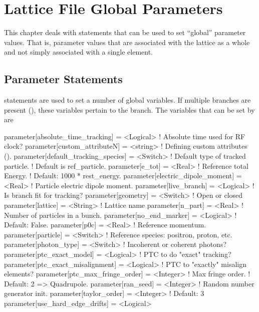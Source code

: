 \chapter{Lattice File Global Parameters}

This chapter deals with statements that can be used to set ``global''
parameter values. That is, parameter values that are associated with
the lattice as a whole and not simply associated with a single element.

\section{Parameter Statements}
\label{s:param}


 statements are used to set a number of global variables.
If multiple branches are present (), these variables pertain
to the  branch. The variables that can be set by  are
\begin{example}
  parameter[absolute_time_tracking]   = <Logical>  ! Absolute time used for RF clock?
  parameter[custom_attributeN]        = <string>   ! Defining custom attributes ().
  parameter[default_tracking_species] = <Switch>   ! Default type of tracked particle. 
                                                   !    Default is ref_particle.
  parameter[e_tot]                    = <Real>     ! Reference total Energy. 
                                                   !      Default: 1000 * rest_energy.
  parameter[electric_dipole_moment]   = <Real>     ! Particle electric dipole moment.
  parameter[live_branch]              = <Logical>  ! Is branch fit for tracking?
  parameter[geometry]                 = <Switch>   ! Open or closed
  parameter[lattice]                  = <String>   ! Lattice name 
  parameter[n_part]                   = <Real>     ! Number of particles in a bunch.
  parameter[no_end_marker]            = <Logical>  ! Default: False.
  parameter[p0c]                      = <Real>     ! Reference momentum.
  parameter[particle]                 = <Switch>   ! Reference species: positron, proton, etc.
  parameter[photon_type]              = <Switch>   ! Incoherent or coherent photons?
  parameter[ptc_exact_model]          = <Logical>  ! PTC to do "exact" tracking?
  parameter[ptc_exact_misalignment]   = <Logical>  ! PTC to "exactly" misalign elements?
  parameter[ptc_max_fringe_order]     = <Integer>  ! Max fringe order. 
                                                   !    Default: 2 => Quadrupole.
  parameter[ran_seed]                 = <Integer>  ! Random number generator init.
  parameter[taylor_order]             = <Integer>  ! Default: 3
  parameter[use_hard_edge_drifts]     = <Logical>
\end{example}

